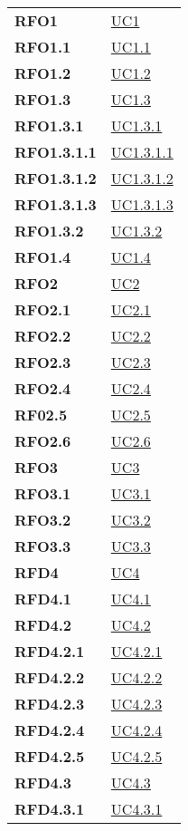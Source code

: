 \begin{longtable}[H]{|>{\centering\bfseries}m{8cm} | >{\centering\arraybackslash}m{8cm} |}
    RFO1 & \hyperref[sub:uc1]{UC1} \\
    RFO1.1 & \hyperref[ssub:uc1.1]{UC1.1} \\
    RFO1.2 & \hyperref[ssub:uc1.2]{UC1.2} \\
    RFO1.3 & \hyperref[ssub:uc1.3]{UC1.3} \\
    RFO1.3.1 & \hyperref[par:uc1.3.1]{UC1.3.1} \\
    RFO1.3.1.1 & \hyperref[spar:uc1.3.1.1]{UC1.3.1.1} \\
    RFO1.3.1.2 & \hyperref[spar:uc1.3.1.2]{UC1.3.1.2} \\
    RFO1.3.1.3 & \hyperref[spar:uc1.3.1.3]{UC1.3.1.3} \\
    RFO1.3.2 & \hyperref[par:uc1.3.2]{UC1.3.2} \\
    RFO1.4 & \hyperref[ssub:uc1.4]{UC1.4} \\
    RFO2 & \hyperref[sub:uc2]{UC2} \\
    RFO2.1 & \hyperref[ssub:uc2.1]{UC2.1} \\
    RFO2.2 & \hyperref[ssub:uc2.2]{UC2.2} \\
    RFO2.3 & \hyperref[ssub:uc2.3]{UC2.3} \\
    RFO2.4 & \hyperref[ssub:uc2.4]{UC2.4} \\
    RF02.5 & \hyperref[ssub:uc2.5]{UC2.5} \\
    RFO2.6 & \hyperref[ssub:uc2.6]{UC2.6} \\
    RFO3 & \hyperref[sub:uc3]{UC3} \\
    RFO3.1 & \hyperref[ssub:uc3.1]{UC3.1} \\
    RFO3.2 & \hyperref[ssub:uc3.2]{UC3.2} \\
    RFO3.3 & \hyperref[ssub:uc3.3]{UC3.3} \\
    RFD4 & \hyperref[sub:uc4]{UC4} \\
    RFD4.1 & \hyperref[ssub:uc4.1]{UC4.1} \\
    RFD4.2 & \hyperref[ssub:uc4.2]{UC4.2} \\
    RFD4.2.1 & \hyperref[par:uc4.2.1]{UC4.2.1} \\
    RFD4.2.2 & \hyperref[par:uc4.2.2]{UC4.2.2} \\
    RFD4.2.3 & \hyperref[par:uc4.2.3]{UC4.2.3} \\
    RFD4.2.4 & \hyperref[par:uc4.2.4]{UC4.2.4} \\
    RFD4.2.5 & \hyperref[par:uc4.2.5]{UC4.2.5} \\
    RFD4.3 & \hyperref[ssub:uc4.3]{UC4.3} \\
    RFD4.3.1 & \hyperref[par:uc4.3.1]{UC4.3.1} \\

\end{longtable}
